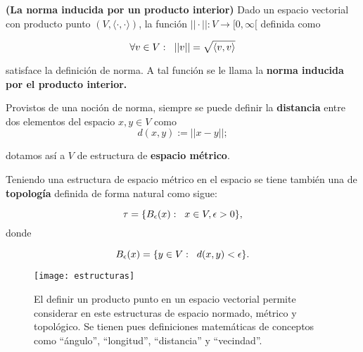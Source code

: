 \begin{prop}
\label{prop: La norma inducida por un producto punto}
\textbf{(La norma inducida por un producto interior)}
Dado un espacio vectorial con
producto punto $(V, \langle \cdot , \cdot \rangle )$, 
la función $|| \cdot || : V \longrightarrow [0, \infty[$ definida como

\begin{equation}
\label{eq: norma via producto punto}
\forall v \in V: \hspace{0.2cm} || v || = \sqrt{\langle v,v \rangle}
\end{equation}

\noindent
satisface la definición de norma. A tal función se le llama
la \textbf{norma inducida por el producto interior.}
\end{prop}

Provistos de una noción de norma, siempre se puede definir
la \textbf{distancia} entre dos elementos del espacio
$x, y \in V$ como 
\begin{equation}
\label{eq: distancia a partir de norma}
d(x, y) := ||x-y||;
\end{equation}

\noindent
dotamos así a $V$ de estructura de \textbf{espacio métrico}.

Teniendo una estructura de espacio métrico en el espacio se tiene también 
una de \textbf{topología} 
definida de forma natural como sigue:

\begin{equation}
\label{eq: top espacio con producto punto}
\tau = \{ B_{\epsilon}(x) : \hspace{0.2cm} x \in V, \epsilon >0 \},
\end{equation}
donde 

\[
B_{\epsilon}(x) = \{ y \in V : \hspace{0.2cm} d(x,y) < \epsilon \}.
\]


\begin{figure}[H]
\centering\captionsetup{format = hang}
	\begin{measuredfigure}
		\texttt{[image: estructuras]} 
		\caption{El definir un producto punto en un espacio
		vectorial permite considerar en este estructuras de espacio normado,
		métrico y topológico. Se tienen pues definiciones
		matemáticas de conceptos como ``ángulo'', ``longitud'',
		``distancia'' y ``vecindad''.}
 	\end{measuredfigure}
 \end{figure}


